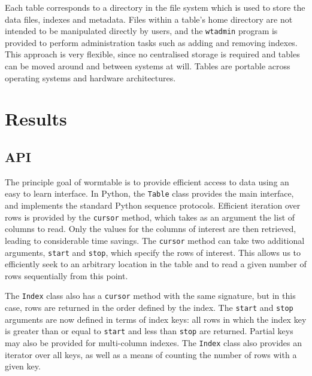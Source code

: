 \documentclass[10pt]{bmc_article}
\newenvironment{bmcformat}{\begin{raggedright}\baselineskip20pt\sloppy\setboolean{publ}{false}}{\end{raggedright}\baselineskip20pt\sloppy}
\begin{document}
\begin{bmcformat}
Each table corresponds to a directory in the file system
which is used to store the data files, indexes and metadata.
Files within a table's home directory are not intended to be 
manipulated directly by users, and the \texttt{wtadmin} program is provided 
to perform administration tasks such as adding and removing 
indexes. This approach is 
very flexible, since no centralised storage is required and 
tables can be moved around and between systems at will.
Tables are portable across operating systems and hardware
architectures.


\section*{Results}

%
\subsection*{API}
The principle goal of wormtable is to provide efficient access to data 
using an easy to learn interface. 
In Python, the \texttt{Table} class provides the main interface,
and implements the standard Python sequence protocols. Efficient 
iteration over rows is provided by the \texttt{cursor} method, 
which takes as an argument the list of columns to read.
Only the values for the columns 
of interest are then retrieved, leading to considerable
time savings. The \texttt{cursor} method can take two additional 
arguments, \texttt{start} and \texttt{stop}, which specify 
the rows of interest. This allows us to efficiently seek to an 
arbitrary location in the table and to read a given number 
of rows sequentially from this point.

The \texttt{Index} class also has a \texttt{cursor} method 
with the same signature, but in this case, rows 
are returned in the order defined by the index. The  
\texttt{start} and \texttt{stop} arguments are now defined 
in terms of index keys: all rows in which the index key
is greater than or equal to \texttt{start} and less 
than \texttt{stop} are returned. Partial keys may also be 
provided for multi-column indexes. The \texttt{Index} 
class also provides an iterator over all keys, as well 
as a means of counting the number of rows with a given 
key.


\end{bmcformat}
\end{document}

